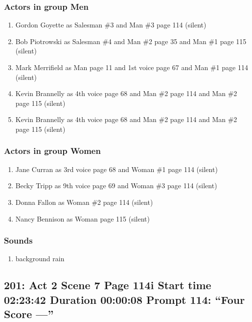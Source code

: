 \subsubsection{Actors in group Men}
\begin{enumerate}
\item Gordon Goyette as Salesman \#3 and Man \#3 page 114 (silent)
\item Bob Piotrowski as Salesman \#4 and Man \#2 page 35 and Man \#1 page 115 (silent)
\item Mark Merrifield as Man page 11 and 1st voice page 67 and Man \#1 page 114 (silent)
\item Kevin Brannelly as 4th voice page 68 and Man \#2 page 114 and Man \#2 page 115 (silent)
\item Kevin Brannelly as 4th voice page 68 and Man \#2 page 114 and Man \#2 page 115 (silent)
\end{enumerate}
\subsubsection{Actors in group Women}
\begin{enumerate}
\item Jane Curran as 3rd voice page 68 and Woman \#1 page 114 (silent)
\item Becky Tripp as 9th voice page 69 and Woman \#3 page 114 (silent)
\item Donna Fallon as Woman \#2 page 114 (silent)
\item Nancy Bennison as Woman page 115 (silent)
\end{enumerate}

\subsubsection{Sounds}
\begin{enumerate}
\item background rain
\end{enumerate}
\subsection{201: Act 2 Scene 7 Page 114i Start time 02:23:42 Duration 00:00:08 Prompt 114: ``Four Score ---''}

